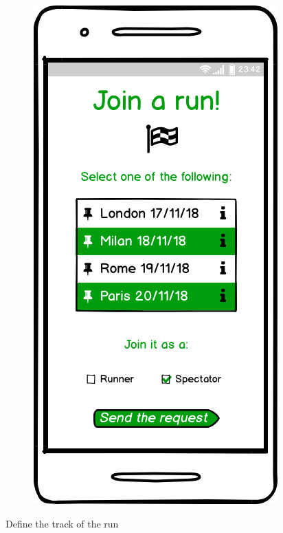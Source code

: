 \documentclass{article}
\begin{document}
\begin{legal}
\begin{legal}
\begin{legal}
\begin{legal}
\begin{figure}[H]
				\centering
  				\includegraphics[scale=0.3]{./images/mockups/Join-a-run.png}
				\end{figure}
				\item Define the track of the run 
				\begin{figure}[H]
				\centering

\end{figure}
\end{legal}
\end{legal}
\end{legal}
\end{legal}
\end{document}
